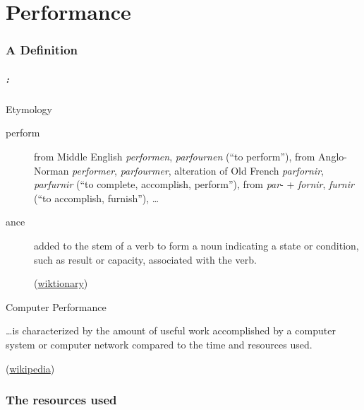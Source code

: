 \documentclass[9pt,xcolor=table]{beamer}
\begin{document}
\part{Performance}
\section{A Definition}
\begin{frame}
\frametitle{\insertsectionhead{} : \insertpart{}
}
\vfill
\begin{block}{Etymology}
  \begin{description}
  \item[perform] from Middle English \textit{performen}, \textit{parfournen} (``to perform''), from Anglo-Norman \textit{performer}, \textit{parfourmer}, alteration of Old French \textit{parfornir}, \textit{parfurnir} (``to complete, accomplish, perform''), from \textit{par}- + \textit{fornir}, \textit{furnir} (``to accomplish, furnish''), \dots
  \item[ance] added to the stem of a verb to form a noun indicating a state or condition, such as result or capacity, associated with the verb.\\
    \begin{flushright}
      \small(\href{http://en.wiktionary.org/wiki/perform}{wiktionary})
    \end{flushright}
  \end{description}
\end{block}
\vfill
\begin{block}{Computer Performance}
  \begin{center}
    \dots is characterized by the amount of \alert<2->{useful work} accomplished by a computer system or computer network compared to the \alert<3->{time} and \alert<4->{resources} used.\\
  \end{center}
  \begin{flushright}
    \small(\href{http://en.wikipedia.org/wiki/Computer_performance}{wikipedia})
  \end{flushright}

  \end{block}
\vfill
\end{frame}

\section[Resources]{The resources used}
\end{document}
